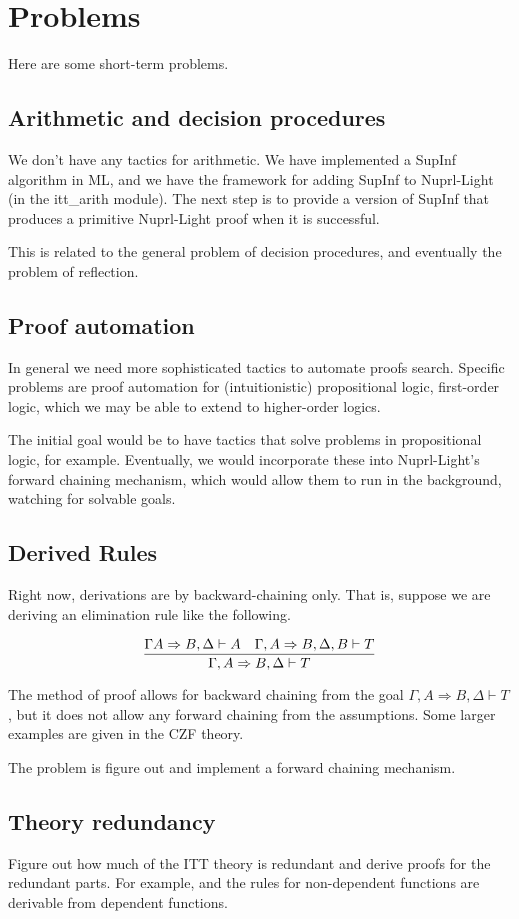 \documentclass{article}
\begin{document}
\section{Problems}

Here are some short-term problems.

\subsection{Arithmetic and decision procedures}
We don't have any tactics for arithmetic.  We have implemented a
SupInf algorithm in ML, and we have the framework for adding SupInf to
Nuprl-Light (in the itt\_arith module).  The next step is to provide a
version of SupInf that produces a primitive Nuprl-Light proof when it
is successful.

This is related to the general problem of decision procedures, and
eventually the problem of reflection.

\subsection{Proof automation}
In general we need more sophisticated tactics to automate proofs
search.  Specific problems are proof automation for (intuitionistic)
propositional logic, first-order logic, which we may be able to extend
to higher-order logics.

The initial goal would be to have tactics that solve problems in
propositional logic, for example.  Eventually, we would incorporate
these into Nuprl-Light's forward chaining mechanism, which would allow
them to run in the background, watching for solvable goals.

\subsection{Derived Rules}
Right now, derivations are by backward-chaining only.  That is,
suppose we are deriving an elimination rule like the following.

$$\infer{\Gamma, A \Rightarrow B, \Delta \vdash T}{\Gamma A
  \Rightarrow B, \Delta \vdash A & \Gamma, A
  \Rightarrow B, \Delta, B \vdash T}$$

The method of proof allows for backward chaining from the goal
$\Gamma, A \Rightarrow B, \Delta \vdash T$, but it does not allow any
forward chaining from the assumptions.  Some larger examples are given
in the CZF theory.

The problem is figure out and implement a forward chaining mechanism.

\subsection{Theory redundancy}
Figure out how much of the ITT theory is redundant and derive proofs
for the redundant parts.  For example, and the rules for non-dependent
functions are derivable from dependent functions.
\end{document}
